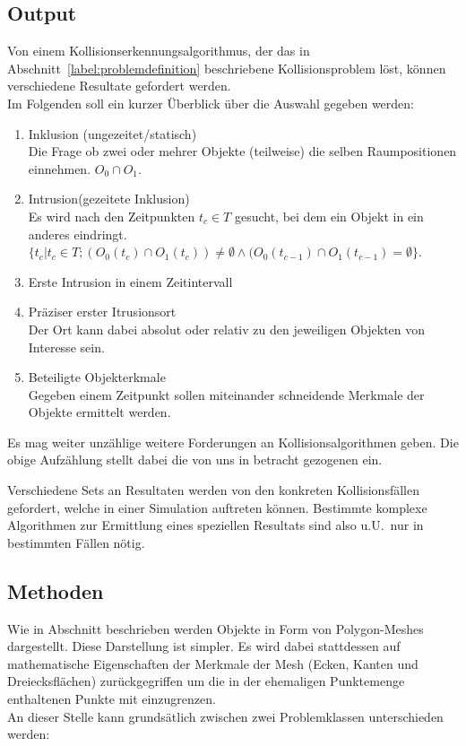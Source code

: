 \subsection{Output}
Von einem Kollisionserkennungsalgorithmus, der das in Abschnitt~\ref{label:problemdefinition} beschriebene Kollisionsproblem löst, können verschiedene Resultate gefordert werden.\\
Im Folgenden soll ein kurzer Überblick über die Auswahl gegeben werden:\\
\begin{enumerate}
	\item Inklusion (ungezeitet/statisch)\\
		Die Frage ob zwei oder mehrer Objekte (teilweise) die selben Raumpositionen einnehmen. $O_0 \cap O_1$.
	\item Intrusion(gezeitete Inklusion)\\
		Es wird nach den Zeitpunkten $t_c \in T$ gesucht, bei dem ein Objekt in ein anderes eindringt.
		$\{t_c | t_c \in T; (O_0(t_c)\cap O_1(t_c))\neq\emptyset\land(O_0(t_{c-1})\cap O_1(t_{c-1})=\emptyset\}$.
	\item Erste Intrusion in einem Zeitintervall
	\item Präziser erster Itrusionsort\\
		Der Ort kann dabei absolut oder relativ zu den jeweiligen Objekten von Interesse sein.
	\item Beteiligte Objekterkmale\\
		Gegeben einem Zeitpunkt sollen miteinander schneidende Merkmale der Objekte ermittelt werden.
\end{enumerate}
Es mag weiter unzählige weitere Forderungen an Kollisionsalgorithmen geben. Die obige Aufzählung stellt dabei die von uns in betracht gezogenen ein.

Verschiedene Sets an Resultaten werden von den konkreten Kollisionsfällen gefordert, welche in einer Simulation auftreten können. Bestimmte komplexe Algorithmen zur Ermittlung eines speziellen Resultats sind also u.U.~nur in bestimmten Fällen nötig.

\subsection{Methoden}

Wie in Abschnitt \label{sec:l0_objects} beschrieben werden Objekte in Form von Polygon-Meshes dargestellt. Diese Darstellung ist simpler. Es wird dabei stattdessen auf mathematische Eigenschaften der Merkmale der Mesh (Ecken, Kanten und Dreiecksflächen) zurückgegriffen um die in der ehemaligen Punktemenge enthaltenen Punkte mit einzugrenzen.\\
An dieser Stelle kann grundsätlich zwischen zwei Problemklassen unterschieden werden:

